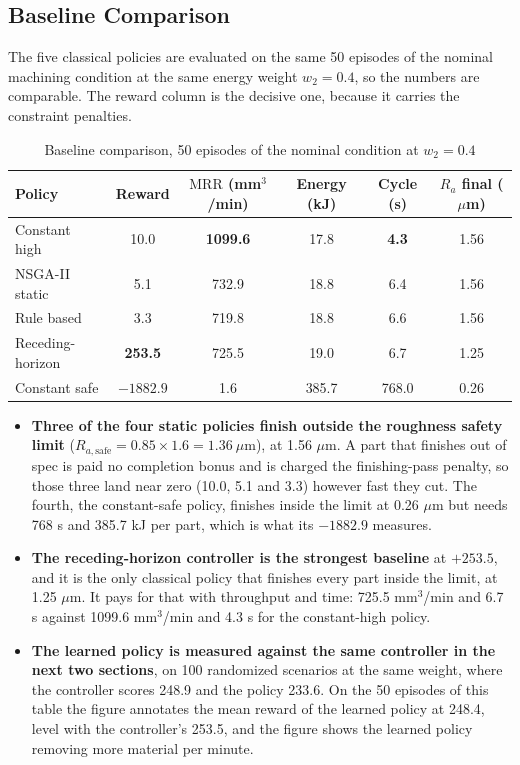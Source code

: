 \documentclass[11pt,a4paper]{article}
\newcommand{\alert}[1]{\textcolor{IITGold}{\textbf{#1}}}
\newcommand{\MRR}{\mathrm{MRR}}
\newcommand{\Ra}{R_a}
\newcommand{\RaSafe}{R_{a,\text{safe}}}
\begin{document}
\subsection{Baseline Comparison}
The five classical policies are evaluated on the same 50 episodes of the nominal machining condition at the same energy weight $w_2 = 0.4$, so the numbers are comparable. The reward column is the decisive one, because it carries the constraint penalties.

\begin{table}[H]
\centering
\caption{Baseline comparison, 50 episodes of the nominal condition at $w_2 = 0.4$}
\label{tab:baselines}
\small
\setlength{\tabcolsep}{4pt}
\begin{tabular}{@{}lccccc@{}}
\toprule
\textbf{Policy} & \textbf{Reward} & \textbf{$\MRR$ (mm$^3$/min)} & \textbf{Energy (kJ)} & \textbf{Cycle (s)} & \textbf{$\Ra$ final ($\mu$m)} \\
\midrule
Constant high & 10.0 & \alert{1099.6} & 17.8 & \alert{4.3} & 1.56 \\
NSGA-II static & 5.1 & 732.9 & 18.8 & 6.4 & 1.56 \\
Rule based & 3.3 & 719.8 & 18.8 & 6.6 & 1.56 \\
Receding-horizon & \alert{253.5} & 725.5 & 19.0 & 6.7 & 1.25 \\
Constant safe & $-1882.9$ & 1.6 & 385.7 & 768.0 & 0.26 \\
\bottomrule
\end{tabular}
\end{table}

\begin{itemize}
    \item \textbf{Three of the four static policies finish outside the roughness safety limit} ($\RaSafe = 0.85 \times 1.6 = 1.36\ \mu$m), at 1.56 $\mu$m. A part that finishes out of spec is paid no completion bonus and is charged the finishing-pass penalty, so those three land near zero (10.0, 5.1 and 3.3) however fast they cut. The fourth, the constant-safe policy, finishes inside the limit at 0.26 $\mu$m but needs 768 s and 385.7 kJ per part, which is what its $-1882.9$ measures.
    \item \textbf{The receding-horizon controller is the strongest baseline} at $+253.5$, and it is the only classical policy that finishes every part inside the limit, at 1.25 $\mu$m. It pays for that with throughput and time: 725.5 mm$^3$/min and 6.7 s against 1099.6 mm$^3$/min and 4.3 s for the constant-high policy.
    \item \textbf{The learned policy is measured against the same controller in the next two sections}, on 100 randomized scenarios at the same weight, where the controller scores 248.9 and the policy 233.6. On the 50 episodes of this table the figure annotates the mean reward of the learned policy at 248.4, level with the controller's 253.5, and the figure shows the learned policy removing more material per minute.
\end{itemize}
\end{document}
